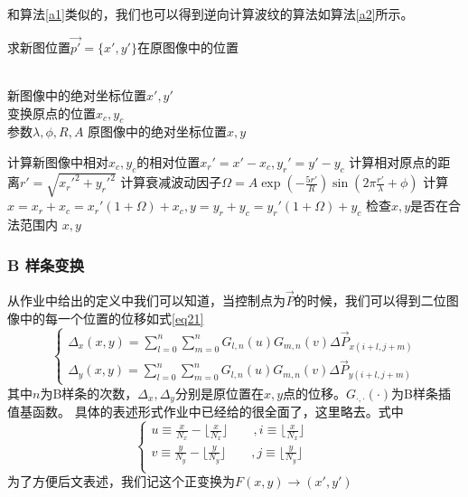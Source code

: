 \documentclass[UTF8,a4paper]{paper}
\begin{document}
和算法\ref{a1}类似的，我们也可以得到逆向计算波纹的算法如算法\ref{a2}所示。
\begin{algorithm}[h]\caption{求新图位置$\vec{p'} = \{x',y'\}$在原图像中的位置}\label{a2}\begin{algorithmic}
    \Require \\ 新图像中的绝对坐标位置$x',y'$\\ 变换原点的位置$x_c,y_c$\\ 参数$\lambda,\phi,R,A$
    \Ensure 原图像中的绝对坐标位置$x,y$\end{algorithmic}\begin{algorithmic}[1]
    \State 计算新图像中相对$x_c,y_c$的相对位置$x_r' = x' - x_c, y_r' = y' - y_c$
    \State 计算相对原点的距离$r' = \sqrt{x_r'^2 + y_r'^2}$
    \State 计算衰减波动因子$\Omega = A\exp(-\frac{5r'}{R})\sin(2\pi\frac{r'}{\lambda}+\phi)$
    \State 计算$x = x_r + x_c = x_r'(1+\Omega) + x_c,y = y_r + y_c = y_r'(1+\Omega) + y_c$
    \State 检查$x,y$是否在合法范围内
    \State \Return $x,y$
    \EndFunction
\end{algorithmic}\end{algorithm}

\subsubsection{B 样条变换}
从作业中给出的定义中我们可以知道，当控制点为$\vec{P}$的时候，我们可以得到二位图像中的每一个位置的位移如式\ref{eq21}
\begin{equation}\begin{cases}
    \displaystyle{ \Delta_x(x,y) = \sum_{l=0}^n\sum_{m=0}^n G_{l,n}(u)G_{m,n}(v)\Delta\vec{P}_{x(i+l,j+m)}} \\ 
    \displaystyle{ \Delta_y(x,y) = \sum_{l=0}^n\sum_{m=0}^n G_{l,n}(u)G_{m,n}(v)\Delta\vec{P}_{y(i+l,j+m)}}
\label{eq21}\end{cases}\end{equation}
其中$n$为B样条的次数，$\Delta_x,\Delta_y$分别是原位置在$x,y$点的位移。$G_{\cdot,\cdot}(\cdot)$为B样条插值基函数。
具体的表述形式作业中已经给的很全面了，这里略去。式中
\begin{equation}\begin{cases}
\displaystyle{u\equiv\frac{x}{N_x} - \biggl\lfloor\frac{x}{N_x}\biggr\rfloor\qquad,
i\equiv\biggl\lfloor\frac{x}{N_x}\biggr\rfloor\qquad} \\ 
\displaystyle{v\equiv\frac{y}{N_y} - \biggl\lfloor\frac{y}{N_y}\biggr\rfloor\qquad,
j\equiv\biggl\lfloor\frac{y}{N_y}\biggr\rfloor\qquad} \\
\end{cases}\end{equation}
为了方便后文表述，我们记这个正变换为$F(x,y) \rightarrow (x',y')$
\end{document}
